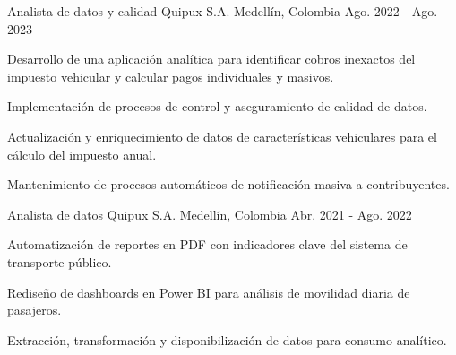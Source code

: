 


\begin{cventries}


\cventry
{Analista de datos y calidad} %
{Quipux S.A.} %
{Medellín, Colombia} %
{Ago. 2022 - Ago. 2023} %
{ %
\begin{cvitems}
\item {Desarrollo de una aplicación analítica para identificar cobros inexactos del impuesto vehicular y calcular pagos individuales y masivos.}
\item {Implementación de procesos de control y aseguramiento de calidad de datos.}
\item {Actualización y enriquecimiento de datos de características vehiculares para el cálculo del impuesto anual.}
\item {Mantenimiento de procesos automáticos de notificación masiva a contribuyentes.\hfill \break}
\end{cvitems}
}


\cventry
{Analista de datos} %
{Quipux S.A.} %
{Medellín, Colombia   } %
{Abr. 2021 - Ago. 2022} %
{ %
\begin{cvitems}
\item {Automatización de reportes en PDF con indicadores clave del sistema de transporte público.}
\item {Rediseño de dashboards en Power BI para análisis de movilidad diaria de pasajeros.}
\item {Extracción, transformación y disponibilización de datos para consumo analítico.}
\end{cvitems}
}



\end{cventries}
